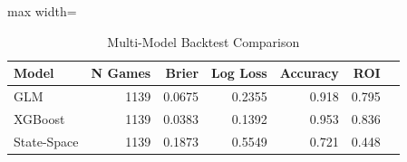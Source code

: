\begin{table}[htbp]
\centering
\caption{Multi-Model Backtest Comparison}
\label{tab:multimodel}
\begin{adjustbox}{max width=\textwidth}
\begin{tabular}{lrrrrrr}
\toprule
 \textbf{Model} & \textbf{N Games} & \textbf{Brier} & \textbf{Log Loss} & \textbf{Accuracy} & \textbf{ROI} \\
\midrule
GLM & 1139 & 0.0675 & 0.2355 & 0.918 & 0.795 \\
XGBoost & 1139 & 0.0383 & 0.1392 & 0.953 & 0.836 \\
State-Space & 1139 & 0.1873 & 0.5549 & 0.721 & 0.448 \\
\bottomrule
\end{tabular}
\end{adjustbox}
\end{table}
